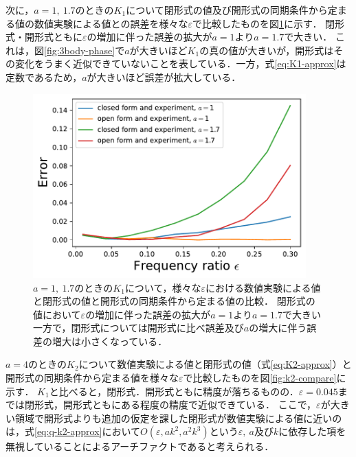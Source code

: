 \documentclass[../main]{subfiles}
\begin{document}
次に，$a=1,\ 1.7$のときの$K_1$について閉形式の値及び開形式の同期条件から定まる値の数値実験による値との誤差を様々な$\varepsilon$で比較したものを図\ref{fig:k1-error}に示す．
閉形式・開形式ともに$\varepsilon$の増加に伴った誤差の拡大が$a=1$より$a=1.7$で大きい．
これは，図\ref{fig:3body-phase}で$a$が大きいほど$K_1$の真の値が大きいが，開形式はその変化をうまく近似できていないことを表している．一方，式\eqref{eq:K1-approx}は定数であるため，$a$が大きいほど誤差が拡大している．

\begin{figure}[tbp]
\centering
\includegraphics[width=105mm]{./images/k1-error.pdf}
\centering
\caption{$a=1,\ 1.7$のときの$K_1$について，様々な$\varepsilon$における数値実験による値と閉形式の値と開形式の同期条件から定まる値の比較．
閉形式の値において$\varepsilon$の増加に伴った誤差の拡大が$a=1$より$a=1.7$で大きい一方で，閉形式については開形式に比べ誤差及び$a$の増大に伴う誤差の増大は小さくなっている．}
\label{fig:k1-error}
\end{figure}

$a=4$のときの$K_2$について数値実験による値と閉形式の値（式\eqref{eq:K2-approx}）と開形式の同期条件から定まる値を様々な$\varepsilon$で比較したものを図\ref{fig:k2-compare}に示す．
$K_1$と比べると，閉形式．開形式ともに精度が落ちるものの．$\varepsilon=0.045$までは閉形式，開形式ともにある程度の精度で近似できている．
ここで，$\varepsilon$が大きい領域で開形式よりも追加の仮定を課した閉形式が数値実験による値に近いのは，式\eqref{eq:q-k2-approx}において$O(\varepsilon,ak^2,a^2k^3)$という$\varepsilon,\ a$及び$k$に依存した項を無視していることによるアーチファクトであると考えられる．
\end{document}

